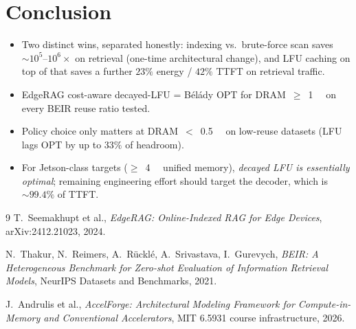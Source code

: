 \documentclass[11pt]{article}
\begin{document}
\section{Conclusion}
\begin{itemize}
  \item Two distinct wins, separated honestly: indexing vs.\ brute-force scan saves $\sim\!10^{5}$--$10^{6}{\times}$ on retrieval (one-time architectural change), and LFU caching on top of that saves a further $23\%$ energy / $42\%$ TTFT on retrieval traffic.
  \item EdgeRAG cost-aware decayed-LFU = B\'el\'ady OPT for DRAM~$\geq$~\SI{1}{\giga\byte} on every BEIR reuse ratio tested.
  \item Policy choice only matters at DRAM~$<$~\SI{0.5}{\giga\byte} on low-reuse datasets (LFU lags OPT by up to $33\%$ of headroom).
  \item For Jetson-class targets ($\geq$~\SI{4}{\giga\byte} unified memory), \emph{decayed LFU is essentially optimal}; remaining engineering effort should target the decoder, which is $\sim\!99.4\%$ of TTFT.
\end{itemize}


\begin{thebibliography}{9}
T.~Seemakhupt et al.,
\emph{EdgeRAG: Online-Indexed RAG for Edge Devices},
arXiv:2412.21023, 2024.

N.~Thakur, N.~Reimers, A.~R\"uckl\'e, A.~Srivastava, I.~Gurevych,
\emph{BEIR: A Heterogeneous Benchmark for Zero-shot Evaluation of Information Retrieval Models},
NeurIPS Datasets and Benchmarks, 2021.

J.~Andrulis et al.,
\emph{AccelForge: Architectural Modeling Framework for Compute-in-Memory and Conventional Accelerators},
MIT 6.5931 course infrastructure, 2026.
\end{thebibliography}
\end{document}
